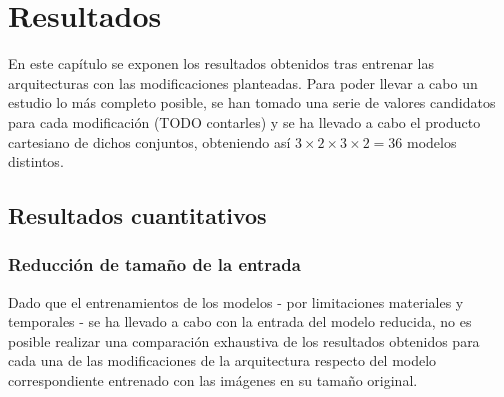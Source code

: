 \section{Resultados}

En este capítulo se exponen los resultados obtenidos tras entrenar las arquitecturas con las modificaciones planteadas. Para poder llevar a cabo un estudio lo más completo posible, se han tomado una serie de valores candidatos para cada modificación (TODO contarles) y se ha llevado a cabo el producto cartesiano de dichos conjuntos, obteniendo así $3 \times 2 \times 3 \times 2 = 36$ modelos distintos.


\subsection{Resultados cuantitativos}

\subsubsection{Reducción de tamaño de la entrada}

Dado que el entrenamientos de los modelos - por limitaciones materiales y temporales - se ha llevado a cabo con la entrada del modelo reducida, no es posible realizar una comparación exhaustiva de los resultados obtenidos para cada una de las modificaciones de la arquitectura respecto del modelo correspondiente entrenado con las imágenes en su tamaño original. 


